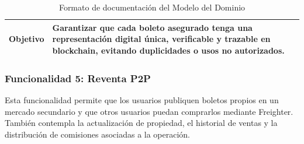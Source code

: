 \documentclass[12pt,letterpaper]{article}
\begin{document}
\begin{table}[H]
\begin{tabularx}{\textwidth}{|p{3.2cm}|X|p{3.8cm}|}
\textbf{Objetivo} & 
\multicolumn{2}{X|}{Garantizar que cada boleto asegurado tenga una representación digital única, verificable y trazable en blockchain, evitando duplicidades o usos no autorizados.} \\ \hline

\end{tabularx}

\caption{Formato de documentación del Modelo del Dominio}
\label{tab:modelo_dominio_boleto_blockchain_nft}
\normalsize
\end{table}

\subsubsection{Funcionalidad 5: Reventa P2P}
Esta funcionalidad permite que los usuarios publiquen boletos propios en un mercado secundario y que otros usuarios puedan comprarlos mediante Freighter. También contempla la actualización de propiedad, el historial de ventas y la distribución de comisiones asociadas a la operación.
\end{document}
